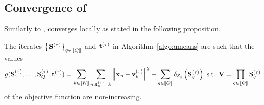 %
%


\iffalse
\begin{remark}[Assignment/Re-estimation trade-off.]
A strategy to tackle this problem would be to first run the vanilla K-means algorithm,
 obtain the matrix of centroids $U$ and then encode $U$ as a product of sparse matrices
 using Hierarchical Palm4MSA. This would however prevent us from taking advantage of 
 the expected low complexity product that plays a role in the assignement step of 
 the procedure.
\end{remark}

\todo[inline]{At some point, talk about the trade-off that we are playing with
regarding the cost of the assignment and the cost of the re-estimation procedure.}
\fi

\subsection{Convergence of \qkmeans}
Similarly to \kmeans, \qkmeans converges locally as stated in the following proposition.

\begin{proposition}
\label{thm:convergence}
The iterates $\left \lbrace{\mathbf{S}}^{(\tau)} \right \rbrace_{q\in\left \llbracket Q\right \rrbracket}$ and ${\mathbf{t}}^{(\tau)}$ in Algorithm~\ref{algo:qmeans} are such that the values
\begin{align}
\label{eq:qmean_problem_2}
    g({\mathbf{S}}_1^{(\tau)}, \ldots,{\mathbf{S}}_Q^{(\tau)}, {\mathbf{t}}^{(\tau)})
    = \sum_{k\in\left \llbracket K\right \rrbracket} \sum_{n: {\mathbf{t}}^{(\tau)}_n = k} \left \| {\mathbf{x}}_n - {\mathbf{v}}^{(\tau)}_k\right \|^2 + \sum_{q\in\left \llbracket Q\right \rrbracket} \delta_{\mathcal{E}_q}\left ({\mathbf{S}}_q^{(\tau)}\right )
    \text{ s.t. } {\mathbf{V}} = \prod_{q\in\left \llbracket Q\right \rrbracket}{{\mathbf{S}}_q^{(\tau)}}
\end{align}
of the objective function are non-increasing.
\end{proposition}




